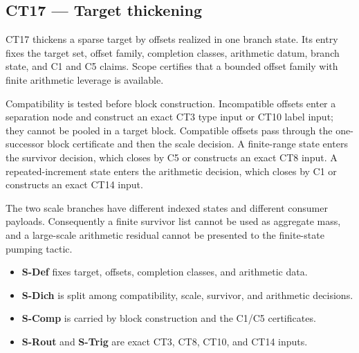 \subsection{CT17 --- Target thickening}\label{ct:17}\label{target-thickening-bounded-offsets-against-sparse-targets}

CT17 thickens a sparse target by offsets realized in one branch state.  Its
entry fixes the target set, offset family, completion classes, arithmetic
datum, branch state, and C1 and C5 claims.  Scope certifies that a bounded
offset family with finite arithmetic leverage is available.

Compatibility is tested before block construction.  Incompatible offsets
enter a separation node and construct an exact CT3 type input or CT10 label
input; they cannot be pooled in a target block.  Compatible offsets pass
through the one-successor block certificate and then the scale decision.  A
finite-range state enters the survivor decision, which closes by C5 or
constructs an exact CT8 input.  A repeated-increment state enters the
arithmetic decision, which closes by C1 or constructs an exact CT14 input.

The two scale branches have different indexed states and different consumer
payloads.  Consequently a finite survivor list cannot be used as aggregate
mass, and a large-scale arithmetic residual cannot be presented to the
finite-state pumping tactic.

\begin{itemize}
\tightlist
\item \textbf{S-Def} fixes target, offsets, completion classes, and arithmetic data.
\item \textbf{S-Dich} is split among compatibility, scale, survivor, and arithmetic decisions.
\item \textbf{S-Comp} is carried by block construction and the C1/C5 certificates.
\item \textbf{S-Rout} and \textbf{S-Trig} are exact CT3, CT8, CT10, and CT14 inputs.
\end{itemize}

